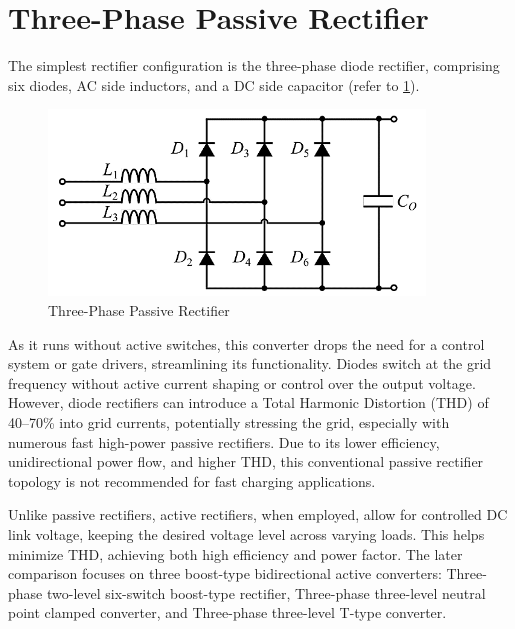 \documentclass[12pt,a4paper]{book}
\begin{document}
\section{Three-Phase Passive Rectifier}
The simplest rectifier configuration is the three-phase diode rectifier, comprising six diodes, AC side inductors, and a DC side capacitor (refer to \ref{fig:image3}).

\begin{figure}[h]
  \centering
  \includegraphics[width=10cm]{image3.png}
  \caption{Three-Phase Passive Rectifier}
  \label{fig:image3}
\end{figure}

As it runs without active switches, this converter drops the need for a control system or gate drivers, streamlining its functionality. Diodes switch at the grid frequency without active current shaping or control over the output voltage. However, diode rectifiers can introduce a Total Harmonic Distortion (THD) of 40–70\% into grid currents, potentially stressing the grid, especially with numerous fast high-power passive rectifiers. Due to its lower efficiency, unidirectional power flow, and higher THD, this conventional passive rectifier topology is not recommended for fast charging applications.

Unlike passive rectifiers, active rectifiers, when employed, allow for controlled DC link voltage, keeping the desired voltage level across varying loads. This helps minimize THD, achieving both high efficiency and power factor. The later comparison focuses on three boost-type bidirectional active converters: Three-phase two-level six-switch boost-type rectifier, Three-phase three-level neutral point clamped converter, and Three-phase three-level T-type converter.

\end{document}
